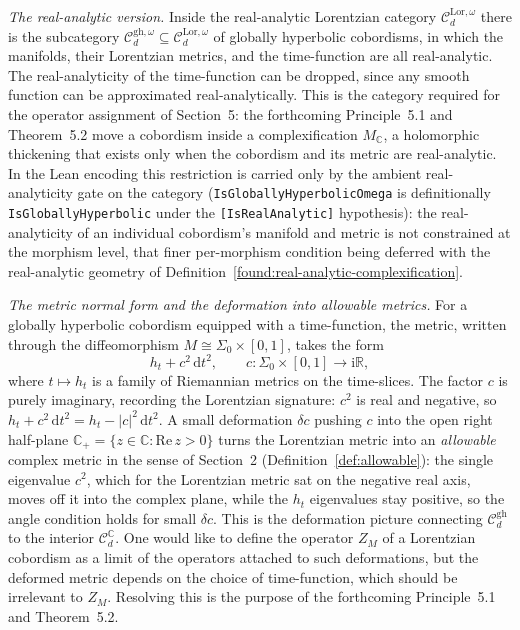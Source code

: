 \begin{definition}
  \emph{The real-analytic version.} Inside the real-analytic Lorentzian category
  $\mathcal C_d^{\mathrm{Lor},\omega}$ there is the subcategory
  $\mathcal C_d^{\mathrm{gh},\omega} \subseteq \mathcal C_d^{\mathrm{Lor},\omega}$ of
  globally hyperbolic cobordisms, in which the manifolds, their Lorentzian metrics,
  and the time-function are all real-analytic. The real-analyticity of the
  time-function can be dropped, since any smooth function can be approximated
  real-analytically. This is the category required for the operator assignment of
  Section~5: the forthcoming Principle~5.1 and Theorem~5.2 move a cobordism inside a
  complexification $M_{\mathbb C}$, a holomorphic thickening that exists only when the
  cobordism and its metric are real-analytic. In the Lean encoding this restriction is
  carried only by the ambient real-analyticity gate on the category
  (\texttt{IsGloballyHyperbolicOmega} is definitionally \texttt{IsGloballyHyperbolic}
  under the \texttt{[IsRealAnalytic]} hypothesis): the real-analyticity of an individual
  cobordism's manifold and metric is not constrained at the morphism level, that finer
  per-morphism condition being deferred with the real-analytic geometry of
  Definition~\ref{found:real-analytic-complexification}.

  \emph{The metric normal form and the deformation into allowable metrics.} For a
  globally hyperbolic cobordism equipped with a time-function, the metric, written
  through the diffeomorphism $M \cong \Sigma_0 \times [0,1]$, takes the form
  \[ h_t + c^2 \, \mathrm{d}t^2, \qquad c \colon \Sigma_0 \times [0,1] \to \mathrm{i}\mathbb R, \]
  where $t \mapsto h_t$ is a family of Riemannian metrics on the time-slices. The
  factor $c$ is purely imaginary, recording the Lorentzian signature: $c^2$ is real
  and negative, so $h_t + c^2\,\mathrm{d}t^2 = h_t - |c|^2\,\mathrm{d}t^2$. A small
  deformation $\delta c$ pushing $c$ into the open right half-plane
  $\mathbb C_+ = \{z \in \mathbb C : \mathrm{Re}\,z > 0\}$ turns the Lorentzian metric
  into an \emph{allowable} complex metric in the sense of Section~2
  (Definition~\ref{def:allowable}): the single eigenvalue $c^2$, which for the
  Lorentzian metric sat on the negative real axis, moves off it into the complex
  plane, while the $h_t$ eigenvalues stay positive, so the angle condition holds for
  small $\delta c$. This is the deformation picture connecting
  $\mathcal C_d^{\mathrm{gh}}$ to the interior $\mathcal C_d^{\mathbb C}$. One would
  like to define the operator $Z_M$ of a Lorentzian cobordism as a limit of the
  operators attached to such deformations, but the deformed metric depends on the
  choice of time-function, which should be irrelevant to $Z_M$. Resolving this is the
  purpose of the forthcoming Principle~5.1 and Theorem~5.2.


\end{definition}

